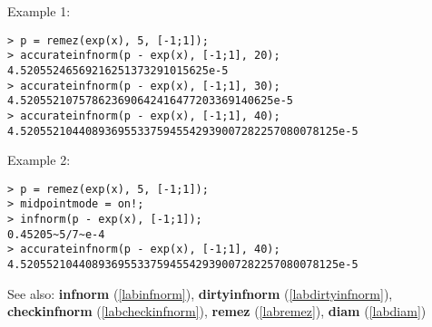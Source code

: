 \noindent Example 1: 
\begin{center}\begin{minipage}{15cm}\begin{Verbatim}[frame=single]
> p = remez(exp(x), 5, [-1;1]);
> accurateinfnorm(p - exp(x), [-1;1], 20);
4.52055246569216251373291015625e-5
> accurateinfnorm(p - exp(x), [-1;1], 30);
4.520552107578623690642416477203369140625e-5
> accurateinfnorm(p - exp(x), [-1;1], 40);
4.5205521044089369553375945542939007282257080078125e-5
\end{Verbatim}
\end{minipage}\end{center}
\noindent Example 2: 
\begin{center}\begin{minipage}{15cm}\begin{Verbatim}[frame=single]
> p = remez(exp(x), 5, [-1;1]);
> midpointmode = on!;
> infnorm(p - exp(x), [-1;1]);
0.45205~5/7~e-4
> accurateinfnorm(p - exp(x), [-1;1], 40);
4.5205521044089369553375945542939007282257080078125e-5
\end{Verbatim}
\end{minipage}\end{center}
See also: \textbf{infnorm} (\ref{labinfnorm}), \textbf{dirtyinfnorm} (\ref{labdirtyinfnorm}), \textbf{checkinfnorm} (\ref{labcheckinfnorm}), \textbf{remez} (\ref{labremez}), \textbf{diam} (\ref{labdiam})
